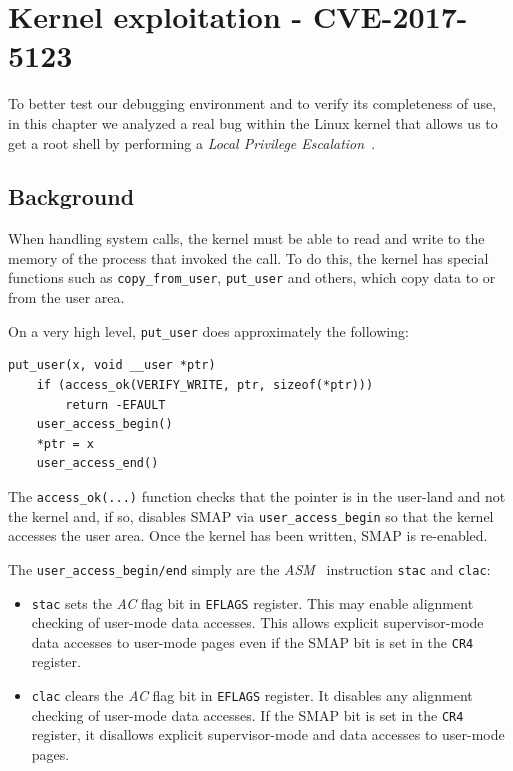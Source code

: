 \documentclass{masterthesis}
\begin{document}
\chapter{Kernel exploitation - CVE-2017-5123}
\label{ch:cve-2017}
To better test our debugging environment and to verify its completeness of use, in this chapter we analyzed a real bug within the Linux kernel that allows us to get a root shell by performing a \emph{Local Privilege Escalation}~\cite{farah2017study}.
\section{Background}
\label{sect:back-cve-2017}
When handling system calls, the kernel must be able to read and write to the memory of the process that invoked the call. To do this, the kernel has special functions such as \texttt{copy\_from\_user}, \texttt{put\_user} and others, which copy data to or from the user area.

On a very high level, \texttt{put\_user} does approximately the following:
\begin{lstlisting}
put_user(x, void __user *ptr)
    if (access_ok(VERIFY_WRITE, ptr, sizeof(*ptr)))
        return -EFAULT
    user_access_begin()
    *ptr = x
    user_access_end()
\end{lstlisting}
The \texttt{access\_ok(...)} function checks that the pointer is in the user-land and not the kernel and, if so, disables SMAP via \texttt{user\_access\_begin} so that the kernel accesses the user area. Once the kernel has been written, SMAP is re-enabled.

The \texttt{user\_access\_begin/end} simply are the \textit{ASM}~\cite{salwan2014introduction} instruction \texttt{stac} and \texttt{clac}:
\begin{itemize}
\item \texttt{stac} sets the \textit{AC} flag bit in \texttt{EFLAGS} register. This may enable alignment checking of user-mode data accesses. This allows explicit supervisor-mode data accesses to user-mode pages even if the SMAP bit is set in the \texttt{CR4} register.
\item \texttt{clac} clears the \textit{AC} flag bit in \texttt{EFLAGS} register. It disables any alignment checking of user-mode data accesses. If the SMAP bit is set in the \texttt{CR4} register, it disallows explicit supervisor-mode and data accesses to user-mode pages.
\end{itemize}
\end{document}

